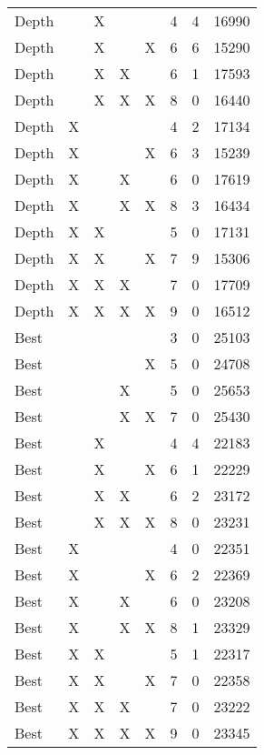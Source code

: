 \begin{tabular}{lllllrrr}
      Depth &    &  X &    &    &        4 &       4 &      16990 \\
      Depth &    &  X &    &  X &        6 &       6 &      15290 \\
      Depth &    &  X &  X &    &        6 &       1 &      17593 \\
      Depth &    &  X &  X &  X &        8 &       0 &      16440 \\
      Depth &  X &    &    &    &        4 &       2 &      17134 \\
      Depth &  X &    &    &  X &        6 &       3 &      15239 \\
      Depth &  X &    &  X &    &        6 &       0 &      17619 \\
      Depth &  X &    &  X &  X &        8 &       3 &      16434 \\
      Depth &  X &  X &    &    &        5 &       0 &      17131 \\
      Depth &  X &  X &    &  X &        7 &       9 &      15306 \\
      Depth &  X &  X &  X &    &        7 &       0 &      17709 \\
      Depth &  X &  X &  X &  X &        9 &       0 &      16512 \\
       Best &    &    &    &    &        3 &       0 &      25103 \\
       Best &    &    &    &  X &        5 &       0 &      24708 \\
       Best &    &    &  X &    &        5 &       0 &      25653 \\
       Best &    &    &  X &  X &        7 &       0 &      25430 \\
       Best &    &  X &    &    &        4 &       4 &      22183 \\
       Best &    &  X &    &  X &        6 &       1 &      22229 \\
       Best &    &  X &  X &    &        6 &       2 &      23172 \\
       Best &    &  X &  X &  X &        8 &       0 &      23231 \\
       Best &  X &    &    &    &        4 &       0 &      22351 \\
       Best &  X &    &    &  X &        6 &       2 &      22369 \\
       Best &  X &    &  X &    &        6 &       0 &      23208 \\
       Best &  X &    &  X &  X &        8 &       1 &      23329 \\
       Best &  X &  X &    &    &        5 &       1 &      22317 \\
       Best &  X &  X &    &  X &        7 &       0 &      22358 \\
       Best &  X &  X &  X &    &        7 &       0 &      23222 \\
       Best &  X &  X &  X &  X &        9 &       0 &      23345 \\
\bottomrule
\end{tabular}
\unskip